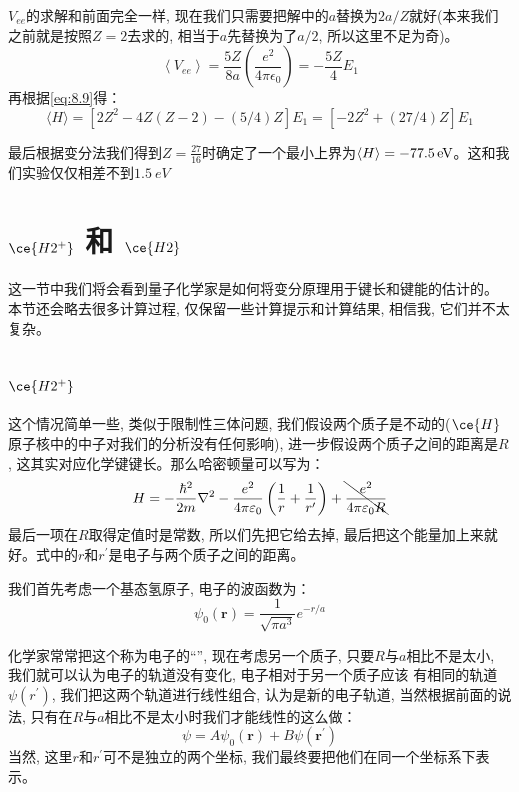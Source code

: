 \documentclass[a4paper,zihao=-4,linespread=1]{ctexrep}
\begin{document}
    $V_{ee}$的求解和前面完全一样, 现在我们只需要把解中的$a$替换为$2a/Z $就好(本来我们之前就是按照$Z=2$去求的, 相当于$a$先替换为了$a/2$, 所以这里不足为奇)。
    \[\left\langle V_{e e}\right\rangle=\frac{5 Z}{8 a}\left(\frac{e^{2}}{4 \pi \epsilon_{0}}\right)=-\frac{5 Z}{4} E_{1}\]
    再根据\ref{eq:8.9}得：
    \[\langle H\rangle=\left[2 Z^{2}-4 Z(Z-2)-(5 / 4) Z\right] E_{1}=\left[-2 Z^{2}+(27 / 4) Z\right] E_{1}\]
    
    最后根据变分法我们得到$Z=\frac{27}{16}$时确定了一个最小上界为$\braket{H}=\SI[]{-77.5}{eV}$。这和我们实验仅仅相差不到$\SI[]{1.5}{eV}$

    \section{$\ce{H2^+}$ 和 $\ce{H2}$}
    这一节中我们将会看到量子化学家是如何将变分原理用于键长和键能的估计的。
    本节还会略去很多计算过程, 仅保留一些计算提示和计算结果, 相信我, 它们并不太复杂。
    \subsection*{$\ce{H2^+}$}
    这个情况简单一些, 类似于限制性三体问题, 我们假设两个质子是不动的($\ce{H}$原子核中的中子对我们的分析没有任何影响), 进一步假设两个质子之间的距离是$R$, 
    这其实对应化学键键长。那么哈密顿量可以写为：
    \begin{equation}
        H=-\frac{\hbar^2}{2m}\nabla^2-\frac{e^2}{4\pi\varepsilon_0}\left(\frac{1}{r}+\frac{1}{r^\prime}\right)+\bcancel{\frac{e^2}{4\pi\varepsilon_0R}}
    \end{equation}
    最后一项在$R$取得定值时是常数, 所以们先把它给去掉, 最后把这个能量加上来就好。式中的$r$和$r^\prime$是电子与两个质子之间的距离。

    我们首先考虑一个基态氢原子, 电子的波函数为：
    \[\psi_0(\mathbf{r})=\frac{1}{\sqrt{\pi a^3}}e^{-r/a}\]
    
    化学家常常把这个称为电子的“”, 现在考虑另一个质子, 只要$R$与$a$相比不是太小, 我们就可以认为电子的轨道没有变化, 电子相对于另一个质子应该
    有相同的轨道$\psi(r^\prime)$, 我们把这两个轨道进行线性组合, 认为是新的电子轨道, 当然根据前面的说法, 只有在$R$与$a$相比不是太小时我们才能线性的这么做：
    \begin{equation}
        \psi = A\psi_0(\mathbf{r})+B\psi(\mathbf{r^\prime})
    \end{equation}
    当然, 这里$r$和$r^\prime$可不是独立的两个坐标, 我们最终要把他们在同一个坐标系下表示。
\end{document}
